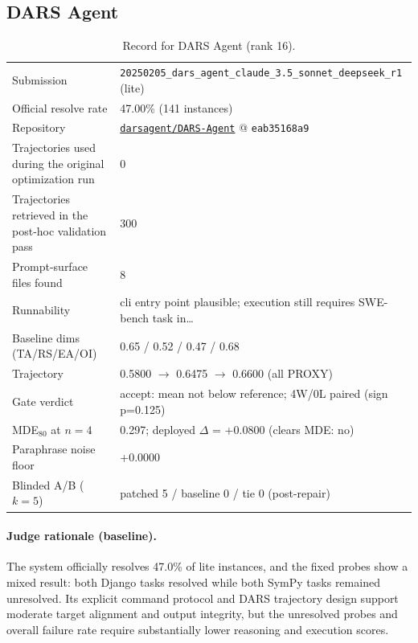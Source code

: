 \subsection{DARS Agent}
\label{app:agent16}
\begin{table}[H]\centering\scriptsize
\caption{Record for DARS Agent (rank 16).}
\begin{tabular}{lp{8.2cm}}\toprule
Submission & \texttt{20250205\_\allowbreak{}dars\_\allowbreak{}agent\_\allowbreak{}claude\_\allowbreak{}3.5\_\allowbreak{}sonnet\_\allowbreak{}deepseek\_\allowbreak{}r1} (lite) \\
Official resolve rate & 47.00\% (141 instances) \\
Repository & \href{https://github.com/darsagent/DARS-Agent}{\texttt{darsagent/DARS-Agent}} @ \texttt{eab35168a9} \\
Trajectories used during the original optimization run & 0 \\
Trajectories retrieved in the post-hoc validation pass & 300 \\
Prompt-surface files found & 8 \\
Runnability & cli entry point plausible; execution still requires SWE-bench task in\ldots{} \\
Baseline dims (TA/RS/EA/OI) & 0.65 / 0.52 / 0.47 / 0.68 \\
Trajectory & 0.5800 $\to$ 0.6475 $\to$ 0.6600 (all PROXY) \\
Gate verdict & accept: mean not below reference; 4W/0L paired (sign p=0.125) \\
MDE$_{80}$ at $n{=}4$ & 0.297; deployed $\Delta$ = +0.0800 (clears MDE: no) \\
Paraphrase noise floor & +0.0000 \\
Blinded A/B ($k{=}5$) & patched 5 / baseline 0 / tie 0 (post-repair) \\
\bottomrule\end{tabular}\end{table}
\paragraph{Judge rationale (baseline).}
The system officially resolves 47.0\% of lite instances, and the fixed probes show a mixed result: both Django tasks resolved while both SymPy tasks remained unresolved. Its explicit command protocol and DARS trajectory design support moderate target alignment and output integrity, but the unresolved probes and overall failure rate require substantially lower reasoning and execution scores.

